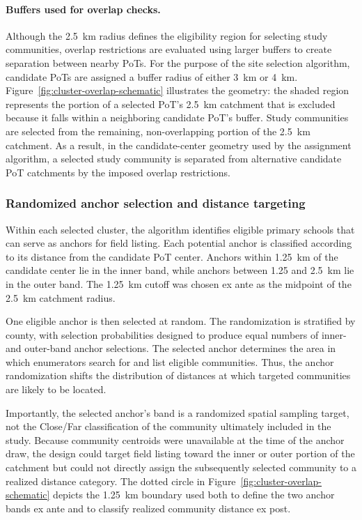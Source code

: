 \documentclass[ECM\space ReStud.tex]{subfiles}
\begin{document}
\paragraph{Buffers used for overlap checks.}
Although the 2.5~km radius defines the eligibility region for selecting study communities, overlap restrictions are evaluated using larger buffers to create separation between nearby PoTs. For the purpose of the site selection algorithm, candidate PoTs are assigned a buffer radius of either 3~km or 4~km. Figure~\ref{fig:cluster-overlap-schematic} illustrates the geometry: the shaded region represents the portion of a selected PoT's 2.5~km catchment that is excluded because it falls within a neighboring candidate PoT's buffer. Study communities are selected from the remaining, non-overlapping portion of the 2.5~km catchment. As a result, in the candidate-center geometry used by the assignment algorithm, a selected study community is separated from alternative candidate PoT catchments by the imposed overlap restrictions.


\subsubsection*{Randomized anchor selection and distance targeting}

Within each selected cluster, the algorithm identifies eligible primary schools that can serve as anchors for field listing. Each potential anchor is classified according to its distance from the candidate PoT center. Anchors within 1.25~km of the candidate center lie in the inner band, while anchors between 1.25 and 2.5~km lie in the outer band. The 1.25~km cutoff was chosen ex ante as the midpoint of the 2.5~km catchment radius.

One eligible anchor is then selected at random. The randomization is stratified by county, with selection probabilities designed to produce equal numbers of inner- and outer-band anchor selections. The selected anchor determines the area in which enumerators search for and list eligible communities. Thus, the anchor randomization shifts the distribution of distances at which targeted communities are likely to be located.

Importantly, the selected anchor's band is a randomized spatial sampling target, not the Close/Far classification of the community ultimately included in the study. Because community centroids were unavailable at the time of the anchor draw, the design could target field listing toward the inner or outer portion of the catchment but could not directly assign the subsequently selected community to a realized distance category. The dotted circle in Figure~\ref{fig:cluster-overlap-schematic} depicts the 1.25~km boundary used both to define the two anchor bands ex ante and to classify realized community distance ex post.
\end{document}
